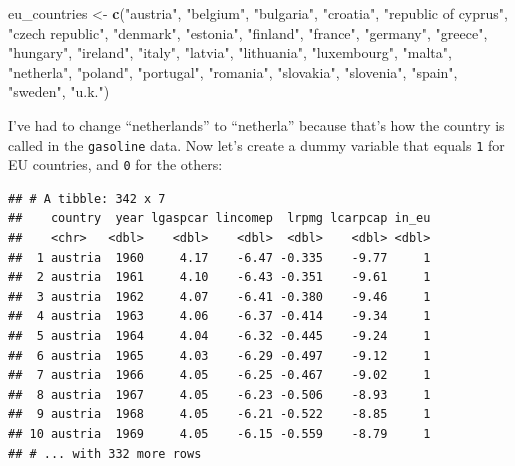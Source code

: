 \documentclass[]{gitbook}
\newenvironment{Shaded}{\begin{snugshade}}{\end{snugshade}}
\newcommand{\DataTypeTok}[1]{\textcolor[rgb]{0.13,0.29,0.53}{#1}}
\newcommand{\DecValTok}[1]{\textcolor[rgb]{0.00,0.00,0.81}{#1}}
\newcommand{\KeywordTok}[1]{\textcolor[rgb]{0.13,0.29,0.53}{\textbf{#1}}}
\newcommand{\NormalTok}[1]{#1}
\newcommand{\OperatorTok}[1]{\textcolor[rgb]{0.81,0.36,0.00}{\textbf{#1}}}
\newcommand{\StringTok}[1]{\textcolor[rgb]{0.31,0.60,0.02}{#1}}
\theoremstyle{definition}
\theoremstyle{definition}
\theoremstyle{definition}
\theoremstyle{remark}
\begin{document}
\begin{Shaded}
\begin{Highlighting}[]
\NormalTok{eu_countries <-}\StringTok{ }\KeywordTok{c}\NormalTok{(}\StringTok{"austria"}\NormalTok{, }\StringTok{"belgium"}\NormalTok{, }\StringTok{"bulgaria"}\NormalTok{, }\StringTok{"croatia"}\NormalTok{, }\StringTok{"republic of cyprus"}\NormalTok{,}
                  \StringTok{"czech republic"}\NormalTok{, }\StringTok{"denmark"}\NormalTok{, }\StringTok{"estonia"}\NormalTok{, }\StringTok{"finland"}\NormalTok{, }\StringTok{"france"}\NormalTok{, }\StringTok{"germany"}\NormalTok{,}
                  \StringTok{"greece"}\NormalTok{, }\StringTok{"hungary"}\NormalTok{, }\StringTok{"ireland"}\NormalTok{, }\StringTok{"italy"}\NormalTok{, }\StringTok{"latvia"}\NormalTok{, }\StringTok{"lithuania"}\NormalTok{, }\StringTok{"luxembourg"}\NormalTok{,}
                  \StringTok{"malta"}\NormalTok{, }\StringTok{"netherla"}\NormalTok{, }\StringTok{"poland"}\NormalTok{, }\StringTok{"portugal"}\NormalTok{, }\StringTok{"romania"}\NormalTok{, }\StringTok{"slovakia"}\NormalTok{, }\StringTok{"slovenia"}\NormalTok{,}
                  \StringTok{"spain"}\NormalTok{, }\StringTok{"sweden"}\NormalTok{, }\StringTok{"u.k."}\NormalTok{)}
\end{Highlighting}
\end{Shaded}

I've had to change ``netherlands'' to ``netherla'' because that's how
the country is called in the \texttt{gasoline} data. Now let's create a
dummy variable that equals \texttt{1} for EU countries, and \texttt{0}
for the others:

\begin{Shaded}
\end{Shaded}

\begin{verbatim}
## # A tibble: 342 x 7
##    country  year lgaspcar lincomep  lrpmg lcarpcap in_eu
##    <chr>   <dbl>    <dbl>    <dbl>  <dbl>    <dbl> <dbl>
##  1 austria  1960     4.17    -6.47 -0.335    -9.77     1
##  2 austria  1961     4.10    -6.43 -0.351    -9.61     1
##  3 austria  1962     4.07    -6.41 -0.380    -9.46     1
##  4 austria  1963     4.06    -6.37 -0.414    -9.34     1
##  5 austria  1964     4.04    -6.32 -0.445    -9.24     1
##  6 austria  1965     4.03    -6.29 -0.497    -9.12     1
##  7 austria  1966     4.05    -6.25 -0.467    -9.02     1
##  8 austria  1967     4.05    -6.23 -0.506    -8.93     1
##  9 austria  1968     4.05    -6.21 -0.522    -8.85     1
## 10 austria  1969     4.05    -6.15 -0.559    -8.79     1
## # ... with 332 more rows
\end{verbatim}
\end{document}
